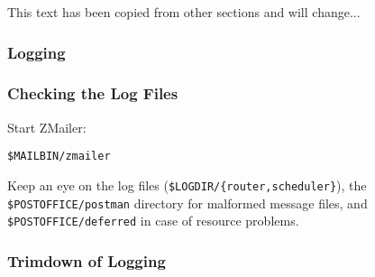 This text has been copied from other sections and will change...




\subsubsection{Logging}




\subsubsection{Checking the Log Files}

Start ZMailer:
\begin{tscreen}
\begin{verbatim}
$MAILBIN/zmailer
\end{verbatim}
\end{tscreen}


Keep an eye on the log files ({\tt \$LOGDIR/\{router,scheduler\}}),
the {\tt \$POSTOFFICE/postman} directory for malformed message files,
and {\tt \$POSTOFFICE/deferred} in case of resource problems.




\subsubsection{Trimdown of Logging}

